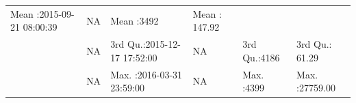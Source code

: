 \documentclass[]{article}
\begin{document}
\begin{longtable}[]{@{}llllll@{}}
\begin{minipage}[t]{0.24\columnwidth}
Mean :2015-09-21 08:00:39\strut
\end{minipage} & \begin{minipage}[t]{0.15\columnwidth}\raggedright\strut
NA\strut
\end{minipage} & \begin{minipage}[t]{0.12\columnwidth}\raggedright\strut
Mean :3492\strut
\end{minipage} & \begin{minipage}[t]{0.15\columnwidth}\raggedright\strut
Mean : 147.92\strut
\end{minipage}\tabularnewline
\begin{minipage}[t]{0.03\columnwidth}\raggedright\strut
\strut
\end{minipage} & \begin{minipage}[t]{0.15\columnwidth}\raggedright\strut
NA\strut
\end{minipage} & \begin{minipage}[t]{0.24\columnwidth}\raggedright\strut
3rd Qu.:2015-12-17 17:52:00\strut
\end{minipage} & \begin{minipage}[t]{0.15\columnwidth}\raggedright\strut
NA\strut
\end{minipage} & \begin{minipage}[t]{0.12\columnwidth}\raggedright\strut
3rd Qu.:4186\strut
\end{minipage} & \begin{minipage}[t]{0.15\columnwidth}\raggedright\strut
3rd Qu.: 61.29\strut
\end{minipage}\tabularnewline
\begin{minipage}[t]{0.03\columnwidth}\raggedright\strut
\strut
\end{minipage} & \begin{minipage}[t]{0.15\columnwidth}\raggedright\strut
NA\strut
\end{minipage} & \begin{minipage}[t]{0.24\columnwidth}\raggedright\strut
Max. :2016-03-31 23:59:00\strut
\end{minipage} & \begin{minipage}[t]{0.15\columnwidth}\raggedright\strut
NA\strut
\end{minipage} & \begin{minipage}[t]{0.12\columnwidth}\raggedright\strut
Max. :4399\strut
\end{minipage} & \begin{minipage}[t]{0.15\columnwidth}\raggedright\strut
Max. :27759.00\strut
\end{minipage}\tabularnewline
\bottomrule
\end{longtable}
\end{document}
